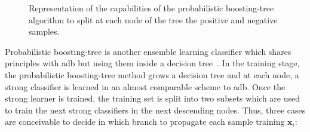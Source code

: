\begin{enumerate}[leftmargin=*]
  \begin{figure}
    \centering
    \caption[Representation of the probabilistic boosting-tree.]{Representation
      of the capabilities of the probabilistic boosting-tree algorithm to split
      at each node of the tree the positive and negative samples.}
    \label{fig:pbtsim}
  \end{figure}

  Probabilistic boosting-tree is another ensemble learning classifier which
  shares principles with \ac{adb} but using them inside a decision
  tree~\cite{Tu2005}.
  In the training stage, the probabilistic boosting-tree method grows a
  decision tree and at each node, a strong classifier is learned in an almost
  comparable scheme to \ac{adb}.
  Once the strong learner is trained, the training set is split into two
  subsets which are used to train the next strong classifiers in the next
  descending nodes.
  Thus, three cases are conceivable to decide in which branch to propagate each
  sample training $\mathbf{x}_i$:


\end{enumerate}
